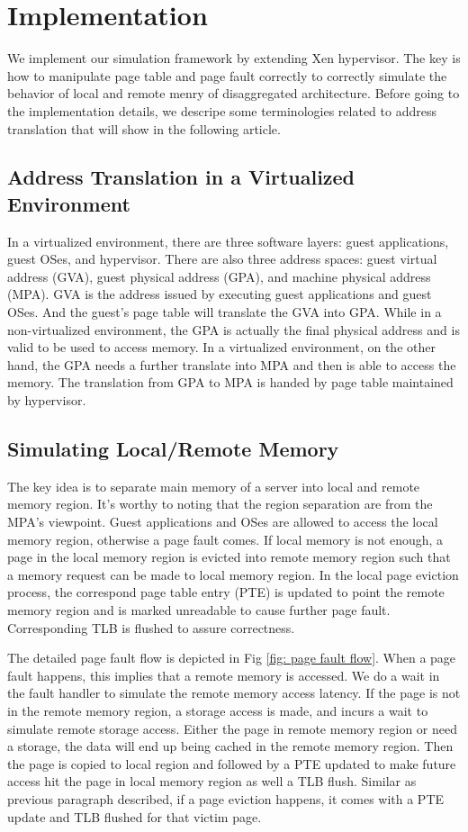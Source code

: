 \documentclass[twocolumn]{article}
\begin{document}
\section{Implementation}

We implement our simulation framework by extending Xen hypervisor. The key is how to manipulate page table and page fault correctly to correctly simulate the behavior of local and remote menry of disaggregated architecture. Before going to the implementation details, we descripe some terminologies related to address translation that will show in the following article.

\subsection{Address Translation in a Virtualized Environment}
In a virtualized environment, there are three software layers: guest applications, guest OSes, and hypervisor. There are also three address spaces: guest virtual address (GVA), guest physical address (GPA), and machine physical address (MPA). GVA is the address issued by executing guest applications and guest OSes. And the guest's page table will translate the GVA into GPA. While in a non-virtualized environment, the GPA is actually the final physical address and is valid to be used to access memory. In a virtualized environment, on the other hand, the GPA needs a further translate into MPA and then is able to access the memory. The translation from GPA to MPA is handed by page table maintained by hypervisor.

\subsection{Simulating Local/Remote Memory}
The key idea is to separate main memory of a server into local and remote memory region. It's worthy to noting that the region separation are from the MPA's viewpoint. Guest applications and OSes are allowed to access the local memory region, otherwise a page fault comes. If local memory is not enough, a page in the local memory region is evicted into remote memory region such that a memory request can be made to local memory region. In the local page eviction process, the correspond page table entry (PTE) is updated to point the remote memory region and is marked unreadable to cause further page fault. Corresponding TLB is flushed to assure correctness.

The detailed page fault flow is depicted in Fig \ref{fig: page fault flow}. When a page fault happens, this implies that a remote memory is accessed. We do a wait in the fault handler to simulate the remote memory access latency. If the page is not in the remote memory region, a storage access is made, and incurs a wait to simulate remote storage access. Either the page in remote memory region or need a storage, the data will end up being cached in the remote memory region. Then the page is copied to local region and followed by a PTE updated to make future access hit the page in local memory region as well a TLB flush. Similar as previous paragraph described, if a page eviction happens, it comes with a PTE update and TLB flushed for that victim page.
\end{document}
